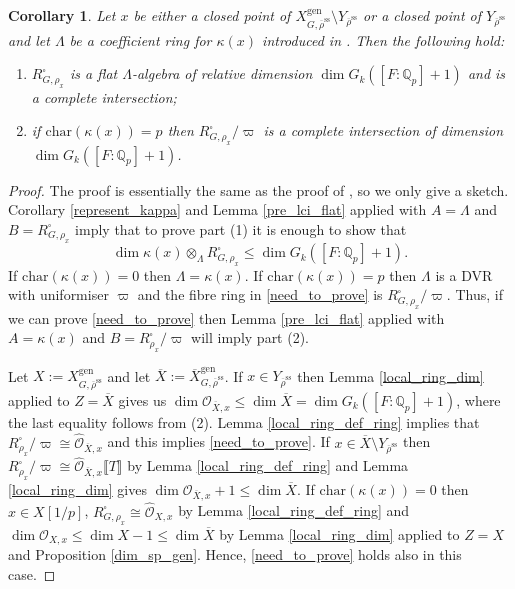 \documentclass{amsart}
\newtheorem{cor}[prop]{Corollary}
\theoremstyle{definition}
\theoremstyle{remark}
\newcommand{\Qp}{\mathbb {Q}_p}
\newcommand{\OO}{\mathcal O}
\newcommand{\br}[1]{\llbracket #1\rrbracket}
\newcommand{\rhobar}{\overline{\rho}}
\newcommand{\gen}{\mathrm{gen}}
\newcommand{\Xbar}{\overline{X}}
\newcommand{\chara}{\mathrm{char}}
\newcommand{\rhobarss}{\rhobar^{\mathrm{ss}}}
\begin{document}
\begin{cor}\label{complete_intersection}
Let $x$ be either a closed point of $X^{\gen}_{G, \rhobarss}\setminus Y_{\rhobarss}$ or  a closed point of $Y_{\rhobarss}$ and let $\Lambda$ be a coefficient ring for $\kappa(x)$ introduced in .  Then the following hold:
\begin{enumerate}
\item $R^{\square}_{G, \rho_x}$ is a flat $\Lambda$-algebra of relative 
dimension $\dim G_k([F:\Qp]+1)$ and is a complete intersection;
\item if $\chara(\kappa(x))=p$ then $R^{\square}_{G, \rho_x}/\varpi$ is a complete 
intersection of dimension $\dim G_k([F:\Qp]+1)$.
\end{enumerate}
\end{cor}
\begin{proof} The proof is essentially the same as the proof of \cite[Corollary 3.38]{BIP_new}, so 
we only give a sketch. Corollary \ref{represent_kappa} and Lemma \ref{pre_lci_flat} applied 
with $A=\Lambda$ and $B=R^{\square}_{G, \rho_x}$ imply that to prove part (1) it is enough 
to show that 
\begin{equation}\label{need_to_prove}
 \dim \kappa(x)\otimes_{\Lambda} R^{\square}_{G, \rho_x}\le \dim G_k ( [F:\Qp]+1).
\end{equation} 
If $\chara(\kappa(x))=0$ then $\Lambda=\kappa(x)$. If $\chara(\kappa(x))=p$ then $\Lambda$
is a DVR with uniformiser $\varpi$ and the fibre ring in \eqref{need_to_prove} is $R^{\square}_{G, \rho_x}/\varpi$. Thus, if we can prove \eqref{need_to_prove} then Lemma \ref{pre_lci_flat} applied 
with $A=\kappa(x)$ and $B=R^{\square}_{\rho_x}/\varpi$ will imply part (2). 

Let $X:= X^{\gen}_{G, \rhobarss}$ and let $\Xbar:= \Xbar^{\gen}_{G, \rhobarss}$. 
If $x\in Y_{\rhobarss}$ then Lemma \ref{local_ring_dim} applied to $Z=\overline{X}$ gives us 
$\dim \OO_{\Xbar, x}\le \dim \Xbar= \dim G_k ([F:\Qp]+1)$, where the last equality follows from  (2). Lemma \ref{local_ring_def_ring} 
implies that $R^{\square}_{\rho_x}/\varpi\cong \hat{\OO}_{\Xbar,x}$ and this implies \eqref{need_to_prove}. 
If $x\in \Xbar\setminus Y_{\rhobarss}$ then $R^{\square}_{\rho_x}/\varpi\cong \hat{\OO}_{\Xbar,x}\br{T}$
by Lemma \ref{local_ring_def_ring} and Lemma \ref{local_ring_dim} gives
$\dim \OO_{\Xbar, x} +1 \le \dim \Xbar$. If $\chara(\kappa(x))=0$ then 
$x\in X[1/p]$, $R^{\square}_{G, \rho_x}\cong \hat{\OO}_{X, x}$
by Lemma \ref{local_ring_def_ring} and $\dim \OO_{X, x} \le \dim X -1 \le \dim \Xbar$ 
by Lemma \ref{local_ring_dim} applied to $Z=X$ and Proposition \ref{dim_sp_gen}. Hence, 
\eqref{need_to_prove} holds also in this case. 
\end{proof} 
\end{document}
